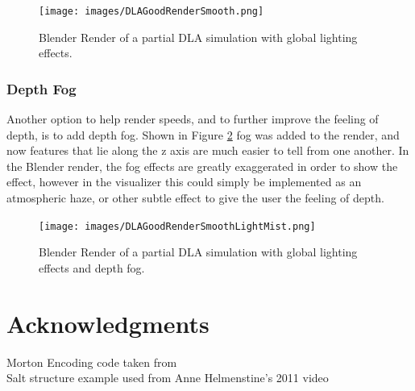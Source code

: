 \documentclass[fleqn,10pt]{UserGuideArx} %
\begin{document}
\begin{figure}[!ht]\centering %
    \texttt{[image: images/DLAGoodRenderSmooth.png]}
    \caption{Blender Render of a partial DLA simulation with global lighting effects.}
    \label{fig:GlobalLighting}
    \end{figure}

\subsubsection{Depth Fog}
Another option to help render speeds, and to further improve the feeling of depth, is to add depth fog. Shown in Figure \ref{fig:BlenderFog} fog was added to the render, and now features that lie along the z axis are much easier to tell from one another. In the Blender render, the fog effects are greatly exaggerated in order to show the effect, however in the visualizer this could simply be implemented as an atmospheric haze, or other subtle effect to give the user the feeling of depth.

\begin{figure}[!ht]\centering %
    \texttt{[image: images/DLAGoodRenderSmoothLightMist.png]}
    \caption{Blender Render of a partial DLA simulation with global lighting effects and depth fog.}
    \label{fig:BlenderFog}
    \end{figure}


\section*{Acknowledgments} %
Morton Encoding code taken from \cite{Karras:2012}\\
Salt structure example used from Anne Helmenstine's 2011 video \cite{Helmenstine:2011}



\end{document}
